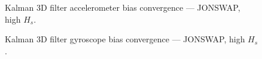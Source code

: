 \documentclass[11pt,letterpaper]{article}
\begin{document}
    \begin{figure}[H]\centering
    \resizebox{\textwidth}{!}{}
    \caption{Kalman 3D filter accelerometer bias convergence — JONSWAP, high $H_s$.}
    \label{fig:w3d_ou3_jonswap_high_acc_bias}
    \end{figure}

    \begin{figure}[H]\centering
    \resizebox{\textwidth}{!}{}
    \caption{Kalman 3D filter gyroscope bias convergence — JONSWAP, high $H_s$.}
    \label{fig:w3d_ou3_jonswap_high_gyro_bias}
    \end{figure}


\end{document}
